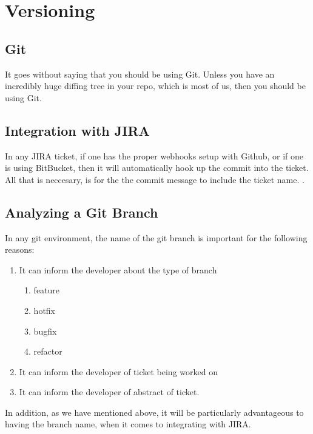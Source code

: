 \maketitle{}
\section{ Versioning }

\subsection { Git }
It goes without saying that you should be using Git. Unless you have an
incredibly huge diffing tree in your repo, which is most of us, then you should
be using Git.

\subsection { Integration with JIRA }
In any JIRA ticket, if one has the proper webhooks setup with Github, or if one
is using BitBucket, then it will automatically hook up the commit into the
ticket. All that is neccesary, is for the the commit message to include the
ticket name. .

\subsection { Analyzing a Git Branch }
In any git environment, the name of the git branch is important for the
following reasons:

\begin{enumerate}
  \item It can inform the developer about the type of branch
    \begin{enumerate}
      \item feature
      \item hotfix
      \item bugfix
      \item refactor
    \end{enumerate}
  \item It can inform the developer of ticket being worked on
  \item It can inform the developer of abstract of ticket.
\end{enumerate}

In addition, as we have mentioned above, it will be particularly advantageous to
having the branch name, when it comes to integrating with JIRA.

